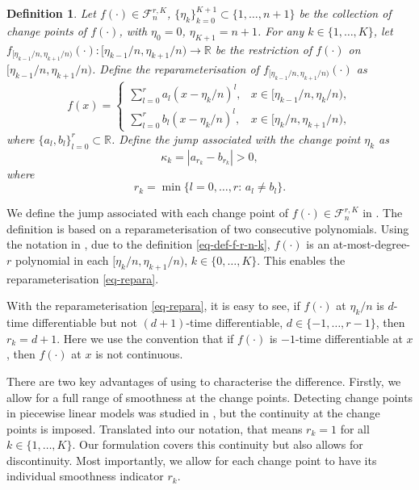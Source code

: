 \documentclass{article}
\newtheorem{definition}[theorem]{Definition}
\begin{document}
\begin{definition}\label{def-jump-size}
Let $f(\cdot) \in \mathcal{F}_n^{r, K}$, $\{\eta_k\}_{k = 0}^{K+1} \subset \{1, \ldots, n+1\}$ be the collection of change points of $f(\cdot)$, with $\eta_0 = 0$, $\eta_{K+1} = n+1$.  For any $k \in \{1, \ldots, K\}$, let $f_{[\eta_{k-1}/n, \eta_{k+1}/n)}(\cdot): [\eta_{k-1}/n, \eta_{k+1}/n) \to \mathbb{R}$ be the restriction of $f(\cdot)$ on $[\eta_{k-1}/n, \eta_{k+1}/n)$.  Define the reparameterisation of $f_{[\eta_{k-1}/n, \eta_{k+1}/n)}(\cdot)$ as
	\begin{equation}\label{eq-repara}
		f(x) = \begin{cases}
 			\sum_{l = 0}^r a_l (x-\eta_k/n)^l, & x \in [\eta_{k-1}/n, \eta_k/n), \\
 			\sum_{l = 0}^r b_l (x-\eta_k/n)^l, & x \in [\eta_k/n, \eta_{k+1}/n),
 		\end{cases}
	\end{equation}
	where $\{a_l, b_l\}_{l=0}^r \subset \mathbb{R}$.  Define the jump associated with the change point $\eta_k$ as 
	\[
		\kappa_k = |a_{r_k} - b_{r_k}| > 0,
	\]
	where 
	\begin{equation}\label{eq-rk-defi}
		r_k = \min\{l = 0, \ldots, r: \, a_l \neq b_l\}.
	\end{equation}
\end{definition}

We define the jump associated with each change point of $f(\cdot) \in \mathcal{F}^{r, K}_n$ in .  The definition is based on a reparameterisation of two consecutive polynomials.  Using the notation in , due to the definition \eqref{eq-def-f-r-n-k}, $f(\cdot)$ is an at-most-degree-$r$ polynomial in each $[\eta_k/n, \eta_{k+1}/n)$, $k \in \{0, \ldots, K\}$.  This enables the reparameterisation \eqref{eq-repara}.

With the reparameterisation \eqref{eq-repara}, it is easy to see, if $f(\cdot)$ at $\eta_k/n$ is $d$-time differentiable but not $(d+1)$-time differentiable, $d \in \{-1, \ldots, r-1\}$, then $r_k = d+1$.  Here we use the convention that if $f(\cdot)$ is $-1$-time differentiable at $x$, then $f(\cdot)$ at $x$ is not continuous.   

There are two key advantages of using  to characterise the difference.  Firstly, we allow for a full range of smoothness at the change points.  Detecting change points in piecewise linear models was studied in \cite{fearnhead2019detecting}, but the continuity at the change points is imposed.  Translated into our notation, that means $r_k = 1$ for all $k \in \{1, \ldots, K\}$.  Our formulation covers this continuity but also allows for discontinuity.  Most importantly, we allow for each change point to have its individual smoothness indicator $r_k$.  
\end{document}
